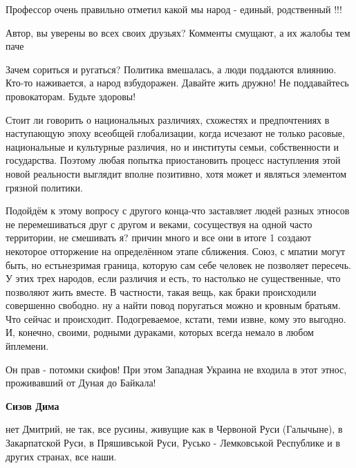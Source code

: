 \begin{itemize}
Профессор очень правильно отметил какой мы народ - единый, родственный !!!


Автор, вы уверены во всех своих друзьях? Комменты смущают, а их жалобы тем паче


Зачем сориться и ругаться? Политика вмешалась, а люди поддаются влиянию. Кто-то
наживается, а народ взбудоражен. Давайте жить дружно! Не поддавайтесь
провокаторам. Будьте здоровы!



Стоит ли говорить о национальных различиях, схожестях и предпочтениях в
наступающую эпоху всеобщей глобализации, когда исчезают не только расовые,
национальные и культурные различия, но и институты семьи, собственности и
государства. Поэтому любая попытка приостановить процесс наступления этой новой
реальности выглядит вполне позитивно, хотя может и являться элементом грязной
политики.


Подойдём к этому вопросу с другого конца-что заставляет людей разных этносов не
перемешиваться друг с другом и веками, сосуществуя на одной часто территории,
не смешивать я? причин много и все они в итоге 1 создают некоторое отторжение на
определённом этапе сближения. Союз, с мпатии могут быть, но естьнезримая
граница, которую сам себе человек не позволяет пересечь. У этих трех народов,
если различия и есть, то настолько не существенные, что позволяют жить вместе.
В частности, такая вещь, как браки происходили совершенно свободно. ну а найти
повод поругаться можно и кровным братьям. Что сейчас и происходит.
Подогреваемое, кстати, теми извне, кому это выгодно. И, конечно, своими,
родными дураками, которых всегда немало в любом йплемени.


Он прав - потомки скифов! При этом Западная Украина не входила в этот этнос,
проживавший от Дуная до Байкала!

\begin{itemize} %
\textbf{Сизов Дима} 

нет Дмитрий, не так, все русины, живущие как в Червоной Руси (Галычыне), в
Закарпатской Руси, в Пряшивськой Руси, Русько - Лемковськой Республике и в
других странах, все наши.

\end{itemize} %



\end{itemize}
